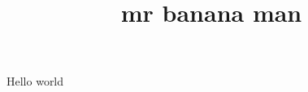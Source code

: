 \documentclass{article}
\begin{document}
\title{mr banana man}

\maketitle


Hello world
\end{document}

